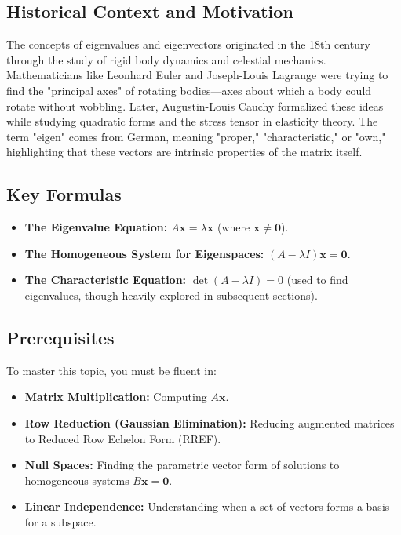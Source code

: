 \documentclass[11pt, a4paper]{article}
\theoremstyle{definition}
\theoremstyle{remark}
\begin{document}
\subsection{Historical Context and Motivation}
The concepts of eigenvalues and eigenvectors originated in the 18th century through the study of rigid body dynamics and celestial mechanics. Mathematicians like Leonhard Euler and Joseph-Louis Lagrange were trying to find the "principal axes" of rotating bodies—axes about which a body could rotate without wobbling. Later, Augustin-Louis Cauchy formalized these ideas while studying quadratic forms and the stress tensor in elasticity theory. The term "eigen" comes from German, meaning "proper," "characteristic," or "own," highlighting that these vectors are intrinsic properties of the matrix itself.

\subsection{Key Formulas}
\begin{itemize}
    \item \textbf{The Eigenvalue Equation:} $A\mathbf{x} = \lambda \mathbf{x}$ (where $\mathbf{x} \neq \mathbf{0}$).
    \item \textbf{The Homogeneous System for Eigenspaces:} $(A - \lambda I)\mathbf{x} = \mathbf{0}$.
    \item \textbf{The Characteristic Equation:} $\det(A - \lambda I) = 0$ (used to find eigenvalues, though heavily explored in subsequent sections).
\end{itemize}

\subsection{Prerequisites}
To master this topic, you must be fluent in:
\begin{itemize}
    \item \textbf{Matrix Multiplication:} Computing $A\mathbf{x}$.
    \item \textbf{Row Reduction (Gaussian Elimination):} Reducing augmented matrices to Reduced Row Echelon Form (RREF).
    \item \textbf{Null Spaces:} Finding the parametric vector form of solutions to homogeneous systems $B\mathbf{x} = \mathbf{0}$.
    \item \textbf{Linear Independence:} Understanding when a set of vectors forms a basis for a subspace.
\end{itemize}
\end{document}
